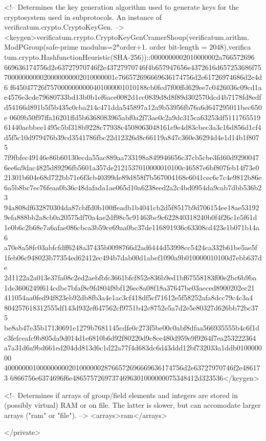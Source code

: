    <!-- Determines the key generation algorithm used to generate keys 
        for the cryptosystem used in subprotocols. An instance of 
        verificatum.crypto.CryptoKeyGen. -->
   <keygen>verificatum.crypto.CryptoKeyGenCramerShoup(verificatum.arithm.
ModPGroup(safe-prime modulus=2*order+1. order bit-length = 2048),verifica
tum.crypto.HashfunctionHeuristic(SHA-256))::0000000002010000002a766572696
669636174756d2e63727970746f2e43727970746f4b657947656e4372616d657253686f75
7000000000020000000002010000001c766572696669636174756d2e61726974686d2e4d6
f645047726f7570000000000401000001010188cb0fcd7f00ffd629ee7c0426036c09cd1a
e4576e3cde79680733bd13b0b1ef6ace0082d1cc0839d8d8f89d302570dcd4b7178fd8edf
d54166d891b5f5b435c0cba214c471dda545897a12a9b53956fb76a6d647295011bec650e
0609b50f97ffa16201ffd5b6368083965abf0a2f73ae0c2a9dc315ca63253df5111765519
61440aebbee1495c5bf318b9228c77938c4508063048161e9e4d83cbec3a3c16d856d1cf4
d5f5c10d979476b39cd3541786fbc22d12326d8c66119a847c360e36294d4e1d14b1f8075
7f9fbfec49146e86b60130ecda55ac889aa733198a849946656c37cb5cbe3fd60d9290047
6ee6a9dac4825d89296fb5601a357de2121537010000010100c46587e6bf807feb14f73e0
21301b604e68d722bb71e6f3cb40399de89d858f7b567004168e6041cec6c7c4e9812b86e
6a5b8bc7ec76feaa0b36c48dafada1ae065d10a6238eed2a2c4bd0954da9cab7dbb536b23
94a808df632870304da87cbffd0b100ffeadb1b4041cb2d5f8517b9d706154ee18ae53192
9efa888bb2a8cb0a20575df70a4ae2df98c5c91463bc9c622840318240b0f4f26c1e5f61d
1e0b6c2b68e7a6afae086cbca3b59ce69aa0bc37de116891936c63308cd423e1b071b14a6
a70e8a58fc03abfcfdff6248a37435b0098766d2ad6444d53998cc5424ca332b61be5ae5f
1feb06c948023b77354ed62412ec494b7dab00d1abef1090a9b010000010100d7ebb637de
2d1122a2a013e37fa08c2ed2aebfbfc3661bfcf852e836b9ed1bf67558183f00e2bc6b9ba
1de3606249f614cdbc7bfaf8e9fd804f8bf126ec8a08f18a37647be03aeced8900202ec21
411054aa0fed94f823eb92db8fb3a4e1ac3cf418df5cf71612e5f58252afa8dcc79c4c3a4
804257618312555df143d932ef647562cf9751b42c8752e5a7d2e5e80327d626bb72bc375
be8ab47e35b17130691e1279b7681145cdfe0c273f5be00c0abf8dfaa566935555b4c6f1d
c3fefceafc9b805da9d014d1e6810b6d92f80220d9c8ce480d959e9f9264f7ea253222364
a7a31d6a9bd661ed204dd813d6c1d22a77f4d683dc6d43ddd12bf732033a1ddb010000000
40000000100000000020100000028766572696669636174756d2e63727970746f2e486173
6866756e6374696f6e48657572697374696301000000075348412d323536</keygen>

   <!-- Determines if arrays of group/field elements and integers are 
        stored in (possibly virtual) RAM or on file. The latter is 
        slower, but can accomodate larger arrays ("ram" or "file"). -->
   <arrays>ram</arrays>

</private>

